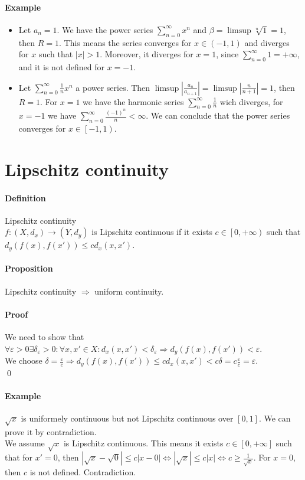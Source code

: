 \documentclass{article}
\newcommand{\DS}{\displaystyle}
\newcommand{\abs}[1]{\left|#1\right|}
\newcommand{\func}[3]{#1 : #2 \rightarrow #3}
\newcommand{\pseries}[1]{\sum_{n=0}^\infty #1}
\newcommand{\intcc}[1]{\left[#1\right]}
\newcommand{\intco}[1]{\left[#1\right)}
\newcommand{\intoo}[1]{\left(#1\right)}
\newcommand{\Ep}{\varepsilon}
\newcommand{\Def}{\paragraph{Definition}}
\newcommand{\Proposition}{\paragraph{Proposition}}
\newcommand{\Proof}{\paragraph{Proof}}
\newcommand{\Example}{\paragraph{Example}}
\begin{document}
  \Example
  \begin{itemize}
    \item %
    Let $a_n = 1$. We have the power series $\DS \pseries{x^n}$ and $\beta =
    \limsup \sqrt[n]{1} = 1$, then $R = 1$. This means the series converges for
    $x \in \intoo{-1,1}$ and diverges for $x$ such that $|x| > 1$. Moreover, it
    diverges for $x = 1$, since $\DS \pseries{1} = +\infty$, and it is not
    defined for $x = -1$.

    \item %
    Let $\DS \pseries{\frac{1}{n}x^n}$ a power series. Then $\limsup
    \abs{\frac{a_n}{a_{n+1}}} = \limsup \abs{\frac{n}{n+1}} = 1$, then $R = 1$.
    For $x = 1$ we have the harmonic series $\DS \pseries{\frac{1}{n}}$ wich
    diverges, for $x = -1$ we have $\DS \pseries{\frac{(-1)^n}{n}} < \infty$. We
    can conclude that the power series converges for $x \in \intco{-1,1}$.
  \end{itemize}


\section{Lipschitz continuity}

  \Def Lipschitz continuity
\\$\func{f}{(X,d_x)}{(Y,d_y)}$ is Lipschitz continuous if it exists $c \in
  \intco{0,+\infty}$ such that $d_y(f(x),f(x')) \leq c d_x(x,x')$.

  \Proposition Lipschitz continuity $\Rightarrow$ uniform continuity.

  \Proof We need to show that $\forall \Ep > 0 \exists \delta_\Ep > 0 : \forall
  x, x' \in X : d_x(x,x') < \delta_\Ep \Rightarrow d_y(f(x),f(x')) < \Ep$.
\\We choose $\delta = \frac{\Ep}{c} \Rightarrow d_y(f(x),f(x')) \leq
  c d_x(x,x') < c \delta = c \frac{\Ep}{c} = \Ep$.
\\\qed

  \Example $\sqrt{x}$ is uniformely continuous but not Lipschitz continuous over
  $\intcc{0,1}$. We can prove it by contradiction.
\\We assume $\sqrt{x}$ is Lipschitz continuous. This means it exists $c \in
  \intcc{0,+\infty}$ such that for $x' = 0$, then $|\sqrt{x} - \sqrt{0}| \leq
  c |x - 0| \iff |\sqrt{x}| \leq c |x| \iff c \geq \frac{1}{\sqrt{x}}$. For
  $x = 0$, then $c$ is not defined. Contradiction.
\end{document}

